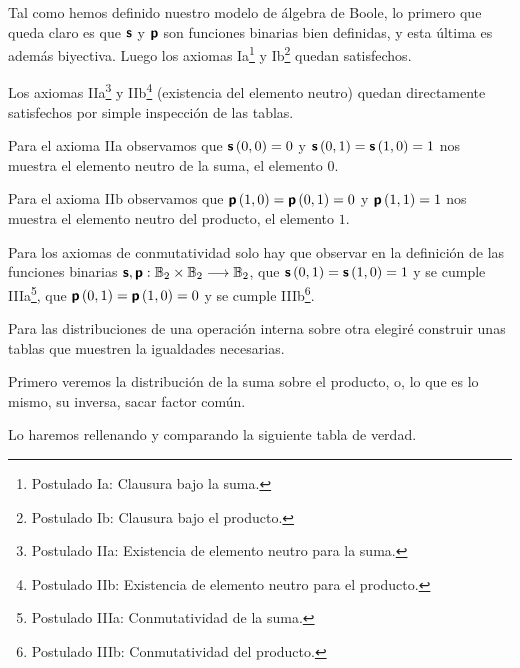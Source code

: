 \documentclass[12pt,a4paper]{article}
\begin{document}
	Tal como hemos definido nuestro modelo de álgebra de Boole, lo primero
que queda claro es que \(\boldsymbol{\mathsf{s}}\) y \(\boldsymbol{\mathsf{p}}\) son funciones binarias
bien definidas, y esta última es además biyectiva. Luego los axiomas
Ia\footnote{Postulado Ia: Clausura bajo la suma.} y Ib\footnote{Postulado Ib: Clausura bajo el producto.} quedan satisfechos. 



	Los axiomas IIa\footnote{Postulado IIa: Existencia de elemento neutro para la suma.} y IIb\footnote{Postulado IIb: Existencia de elemento neutro para el producto.} (existencia del elemento
neutro) quedan directamente satisfechos por simple inspección de las tablas. 



	Para el axioma IIa observamos que \(\boldsymbol{\mathsf{s}}\left({0,0}\right) = 0\) y
\(\boldsymbol{\mathsf{s}}\left({0,1}\right) = \boldsymbol{\mathsf{s}}\left({1,0}\right) = 1\) nos muestra el elemento neutro de
la suma, el elemento \(0\).



	Para el axioma IIb observamos que \( \boldsymbol{\mathsf{p}}\left({1,0}\right) =
\boldsymbol{\mathsf{p}}\left({0,1}\right) = 0\) y \(\boldsymbol{\mathsf{p}}\left({1,1}\right) = 1\) nos muestra el elemento
neutro del producto, el elemento \(1\).



	Para los axiomas de conmutatividad solo hay que observar en la definición
de las funciones binarias \(\boldsymbol{\mathsf{s}},\boldsymbol{\mathsf{p}} : \mathbb{B}_2 \times \mathbb{B}_2
\longrightarrow \mathbb{B}_2\), que \(\boldsymbol{\mathsf{s}}\left({0,1}\right) = \boldsymbol{\mathsf{s}}\left({1,0}\right) = 1\) y se
cumple IIIa\footnote{Postulado IIIa: Conmutatividad de la suma.}, que \(\boldsymbol{\mathsf{p}}\left({0,1}\right) = \boldsymbol{\mathsf{p}}\left({1,0}\right) = 0\) y se
cumple IIIb\footnote{Postulado IIIb: Conmutatividad del producto.}. 



	Para las distribuciones de una operación interna sobre otra elegiré
construir unas tablas que muestren la igualdades necesarias.



	Primero veremos la distribución de la suma sobre el producto, o, lo que
es lo mismo, su inversa, sacar factor común. 



	Lo haremos rellenando y comparando la siguiente tabla de verdad.
\end{document}
